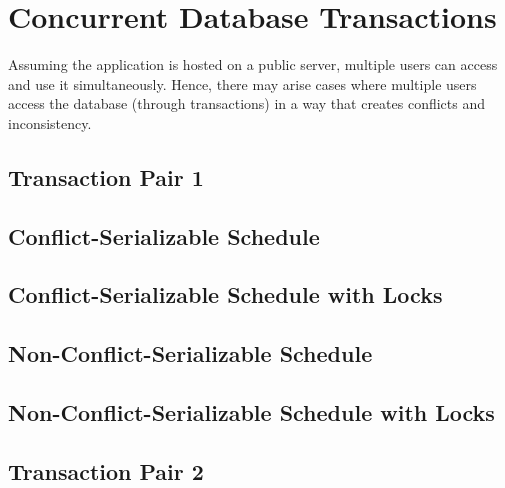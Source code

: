 
\section*{\Huge Concurrent Database Transactions}
\vspace*{10pt}
Assuming the application is hosted on a public server, multiple users can access and use it simultaneously.
Hence, there may arise cases where multiple users access the database (through transactions) in a way that creates conflicts and inconsistency.

\subsection*{Transaction Pair 1}


\subsection*{Conflict-Serializable Schedule}


\subsection*{Conflict-Serializable Schedule with Locks}


\pagebreak

\subsection*{Non-Conflict-Serializable Schedule}


\pagebreak

\subsection*{Non-Conflict-Serializable Schedule with Locks}


\pagebreak

\subsection*{Transaction Pair 2}


